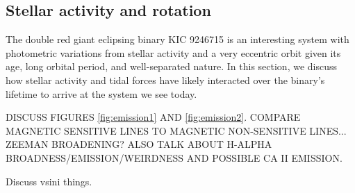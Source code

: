 \subsection{Stellar activity and rotation}\label{actrot}
The double red giant eclipsing binary KIC 9246715 is an interesting system with photometric variations from stellar activity and a very eccentric orbit given its age, long orbital period, and well-separated nature. In this section, we discuss how stellar activity and tidal forces have likely interacted over the binary's lifetime to arrive at the system we see today.

DISCUSS FIGURES \ref{fig:emission1} AND \ref{fig:emission2}. COMPARE MAGNETIC SENSITIVE LINES TO MAGNETIC NON-SENSITIVE LINES... ZEEMAN BROADENING? ALSO TALK ABOUT H-ALPHA BROADNESS/EMISSION/WEIRDNESS AND POSSIBLE CA II EMISSION. \citep{sis70,har73}

Discuss vsini things.
  